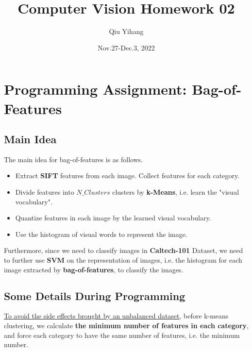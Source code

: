 \documentclass{article}
\title{\textbf{Computer Vision Homework 02}}
\author{Qiu Yihang}
\date{Nov.27-Dec.3, 2022}
\begin{document}
\maketitle

\vspace{3em}
\section{Programming Assignment: Bag-of-Features}
\vspace{1em}
\subsection{Main Idea}
\vspace{1em}

The main idea for bag-of-features is as follows.

\begin{itemize}
    \item Extract \textbf{SIFT} features from each image. Collect features for each category.
    
    \item Divide features into $N\_Clusters$ clusters by \textbf{k-Means}, i.e. learn the "visual vocabulary".
    
    \item Quantize features in each image by the learned visual vocabulary. 
    
    \item Use the histogram of visual words to represent the image.
\end{itemize}

\hspace{-1.8em}
Furthermore, since we need to classify images in \textbf{Caltech-101} Dataset, we need to further use \textbf{SVM} on the representation of images, i.e. the histogram for each image extracted by \textbf{bag-of-features}, to classify the images.

\vspace{1em}
\subsection{Some Details During Programming}
\vspace{1em}

\hspace{2em}
\underline{To avoid the side effects brought by an unbalanced dataset}, before k-means clustering, we calculate \textbf{the minimum number of features in each category}, and force each category to have the same number of features, i.e. the minimum number.
\end{document}
